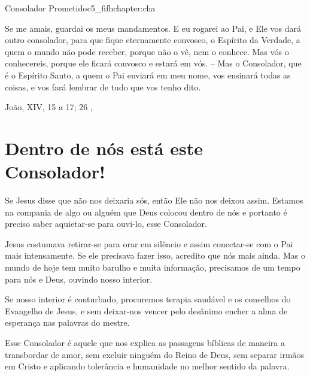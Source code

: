 \begin{chapterpage}{Consolador Prometido}{c5_fifhchapter:cha}

\begin{myquotation} Se me amais, guardai os meus mandamentos. E eu rogarei ao Pai, e Ele vos dará outro consolador, para que fique eternamente convosco, o Espírito da Verdade, a quem o mundo não pode receber, porque não o vê, nem o conhece. Mas vós o conhecereis, porque ele ficará convosco e estará em vós. -- Mas o Consolador, que é o Espírito Santo, a quem o Pai enviará em meu nome, vos ensinará todas as coisas, e vos fará lembrar de tudo que vos tenho dito. 
\par\vspace*{15mm}
\mbox{}\hfill \emdash{}João, XIV, 15 a 17; 26 
, %
\par\end{myquotation}

\end{chapterpage}



\section{Dentro de nós está este Consolador!}\label{c1_basicformatting:sec}

\emdash{}Se Jesus disse que não nos deixaria sós, então Ele não nos deixou assim. Estamos na compania de algo ou alguém que Deus colocou dentro de nós e portanto é preciso saber aquietar-se para ouvi-lo, esse Consolador.

Jesus costumava retirar-se para orar em silêncio e assim conectar-se com o Pai mais intensamente. Se ele precisava fazer isso, acredito que nós mais ainda. Mas o mundo de hoje tem muito barulho e muita informação, precisamos de um tempo para nós e Deus, ouvindo nosso interior.

Se nosso interior é conturbado, procuremos terapia saudável e os conselhos do Evangelho de Jesus, e sem deixar-nos vencer pelo desânimo encher a alma de esperança nas palavras do mestre.

Esse Consolador é aquele que nos explica as passagens bíblicas de maneira a transbordar de amor, sem excluir ninguém do Reino de Deus, sem separar irmãos em Cristo e aplicando tolerância e humanidade no melhor sentido da palavra.

